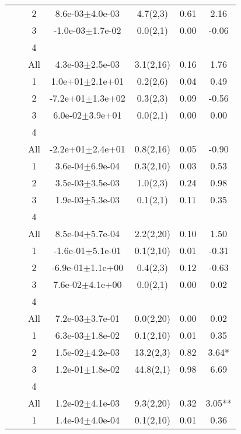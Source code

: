 \begin{longtable}{llccccS[table-format=-2.2, table-space-text-post = {***}]}
   &  & 2 &  8.6e-03$\pm$4.0e-03 & 4.7(2,3) & 0.61 & 2.16 \\ 
   &  & 3 & -1.0e-03$\pm$1.7e-02 & 0.0(2,1) & 0.00 & -0.06 \\ 
   &  & 4 &  &  &  &  \\ 
   &  & All &  4.3e-03$\pm$2.5e-03 & 3.1(2,16) & 0.16 & 1.76 \\ 
   \midrule
{} & {} & 1 &  1.0e+01$\pm$2.1e+01 & 0.2(2,6) & 0.04 & 0.49 \\ 
   &  & 2 & -7.2e+01$\pm$1.3e+02 & 0.3(2,3) & 0.09 & -0.56 \\ 
   &  & 3 &  6.0e-02$\pm$3.9e+01 & 0.0(2,1) & 0.00 & 0.00 \\ 
   &  & 4 &  &  &  &  \\ 
   &  & All & -2.2e+01$\pm$2.4e+01 & 0.8(2,16) & 0.05 & -0.90 \\ 
   \midrule
{} & {} & 1 &  3.6e-04$\pm$6.9e-04 & 0.3(2,10) & 0.03 & 0.53 \\ 
   &  & 2 &  3.5e-03$\pm$3.5e-03 & 1.0(2,3) & 0.24 & 0.98 \\ 
   &  & 3 &  1.9e-03$\pm$5.3e-03 & 0.1(2,1) & 0.11 & 0.35 \\ 
   &  & 4 &  &  &  &  \\ 
   &  & All &  8.5e-04$\pm$5.7e-04 & 2.2(2,20) & 0.10 & 1.50 \\ 
   \midrule
{} & {} & 1 & -1.6e-01$\pm$5.1e-01 & 0.1(2,10) & 0.01 & -0.31 \\ 
   &  & 2 & -6.9e-01$\pm$1.1e+00 & 0.4(2,3) & 0.12 & -0.63 \\ 
   &  & 3 &  7.6e-02$\pm$4.1e+00 & 0.0(2,1) & 0.00 & 0.02 \\ 
   &  & 4 &  &  &  &  \\ 
   &  & All &  7.2e-03$\pm$3.7e-01 & 0.0(2,20) & 0.00 & 0.02 \\ 
   \midrule
{} & {} & 1 &  6.3e-03$\pm$1.8e-02 & 0.1(2,10) & 0.01 & 0.35 \\ 
   &  & 2 &  1.5e-02$\pm$4.2e-03 & 13.2(2,3) & 0.82 & 3.64* \\ 
   &  & 3 &  1.2e-01$\pm$1.8e-02 & 44.8(2,1) & 0.98 & 6.69 \\ 
   &  & 4 &  &  &  &  \\ 
   &  & All &  1.2e-02$\pm$4.1e-03 & 9.3(2,20) & 0.32 & 3.05** \\ 
   \midrule
{} & {} & 1 &  1.4e-04$\pm$4.0e-04 & 0.1(2,10) & 0.01 & 0.36 \\ 

\end{longtable}
